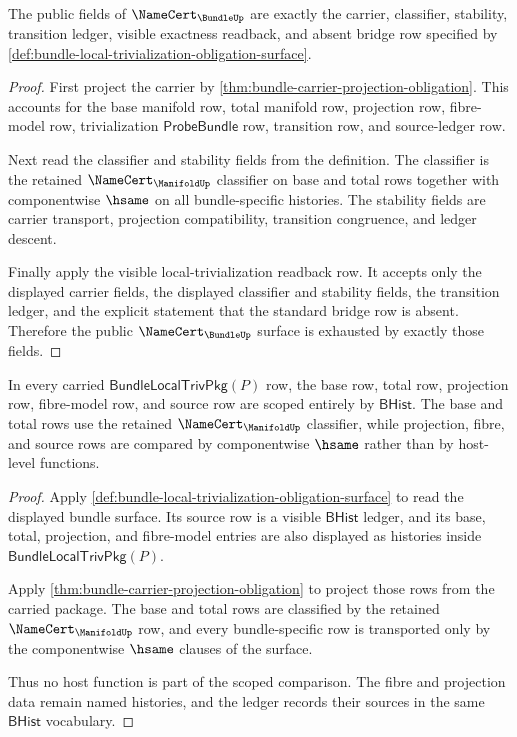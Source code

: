 \begin{theorem}
\label{thm:bundle-namecert-exactness-obligation}
The public fields of $\NameCert_{\BundleUp}$ are exactly the carrier,
classifier, stability, transition ledger, visible exactness readback, and
absent bridge row specified by
\autoref{def:bundle-local-trivialization-obligation-surface}.
\end{theorem}
\begin{proof}
First project the carrier by
\autoref{thm:bundle-carrier-projection-obligation}. This accounts for the base
manifold row, total manifold row, projection row, fibre-model row,
trivialization $\mathsf{ProbeBundle}$ row, transition row, and source-ledger
row.

Next read the classifier and stability fields from the definition. The
classifier is the retained $\NameCert_{\ManifoldUp}$ classifier on base and
total rows together with componentwise $\hsame$ on all bundle-specific
histories. The stability fields are carrier transport, projection
compatibility, transition congruence, and ledger descent.

Finally apply the visible local-trivialization readback row. It accepts only
the displayed carrier fields, the displayed classifier and stability fields,
the transition ledger, and the explicit statement that the standard bridge row
is absent. Therefore the public $\NameCert_{\BundleUp}$ surface is exhausted
by exactly those fields.
\end{proof}

\begin{theorem}
\label{thm:bundle-projection-fibre-source-scope}
In every carried $\mathsf{BundleLocalTrivPkg}(P)$ row, the base row, total row,
projection row, fibre-model row, and source row are scoped entirely by
$\mathsf{BHist}$. The base and total rows use the retained
$\NameCert_{\ManifoldUp}$ classifier, while projection, fibre, and source rows
are compared by componentwise $\hsame$ rather than by host-level functions.
\end{theorem}
\begin{proof}
Apply \autoref{def:bundle-local-trivialization-obligation-surface} to read the
displayed bundle surface. Its source row is a visible $\mathsf{BHist}$ ledger,
and its base, total, projection, and fibre-model entries are also displayed as
histories inside $\mathsf{BundleLocalTrivPkg}(P)$.

Apply \autoref{thm:bundle-carrier-projection-obligation} to project those rows
from the carried package. The base and total rows are classified by the retained
$\NameCert_{\ManifoldUp}$ row, and every bundle-specific row is transported only
by the componentwise $\hsame$ clauses of the surface.

Thus no host function is part of the scoped comparison. The fibre and
projection data remain named histories, and the ledger records their sources in
the same $\mathsf{BHist}$ vocabulary.
\end{proof}

